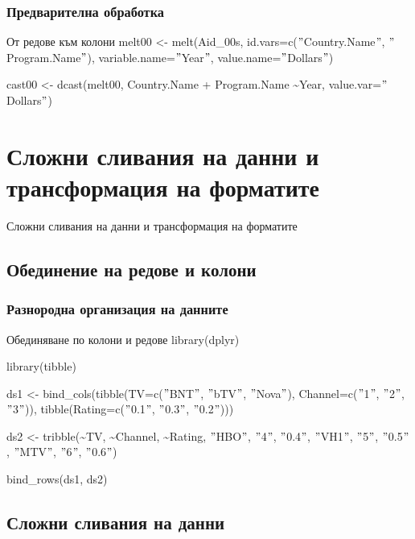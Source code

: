 \documentclass{beamer}
\begin{document}
\begin{frame}
\frametitle{Предварителна обработка}
\begin{block}{От редове към колони}
melt00 <- melt(Aid\_00s, id.vars=c($"$Country.Name$"$, $"$Program.Name$"$), variable.name=$"$Year$"$, value.name=$"$Dollars$"$)
 
cast00 <- dcast(melt00, Country.Name + Program.Name \textasciitilde Year, value.var=$"$Dollars$"$)
\end{block}
\end{frame}

\section{Сложни сливания на данни и трансформация на форматите}

\begin{frame}
\center \huge{Сложни сливания на данни и трансформация на форматите}
\end{frame}

\subsection{Обединение на редове и колони}

\begin{frame}
\frametitle{Разнородна организация на данните}
\begin{block}{Обединяване по колони и редове}
library(dplyr)

library(tibble)

ds1 <- bind\_cols(tibble(TV=c($"$BNT$"$, $"$bTV$"$, $"$Nova$"$), Channel=c($"$1$"$, $"$2$"$, $"$3$"$)), tibble(Rating=c($"$0.1$"$, $"$0.3$"$, $"$0.2$"$)))

ds2 <- tribble(\textasciitilde TV, \textasciitilde Channel, \textasciitilde Rating, $"$HBO$"$, $"$4$"$, $"$0.4$"$, $"$VH1$"$, $"$5$"$, $"$0.5$"$, $"$MTV$"$, $"$6$"$, $"$0.6$"$)

bind\_rows(ds1, ds2)
\end{block}
\end{frame}

\subsection{Сложни сливания на данни}
\end{document}
